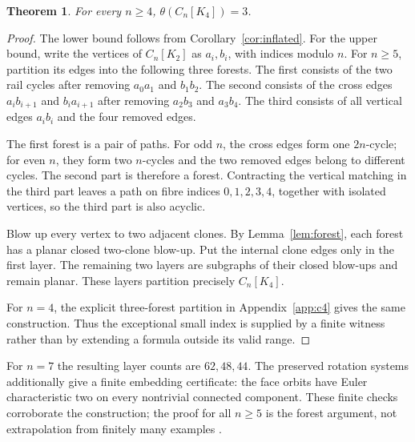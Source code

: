 \documentclass[11pt,letterpaper]{article}
\newtheorem{theorem}{Theorem}[section]
\theoremstyle{definition}
\theoremstyle{remark}\newtheorem{remark}[theorem]{Remark}
\begin{document}
\begin{theorem}\label{thm:thickness3}
For every $n\geq4$, $\theta(C_n[K_4])=3$.
\end{theorem}
\begin{proof}
The lower bound follows from Corollary~\ref{cor:inflated}. For the upper bound, write the vertices of $C_n[K_2]$ as $a_i,b_i$, with indices modulo $n$. For $n\geq5$, partition its edges into the following three forests. The first consists of the two rail cycles after removing $a_0a_1$ and $b_1b_2$. The second consists of the cross edges $a_i b_{i+1}$ and $b_i a_{i+1}$ after removing $a_2b_3$ and $a_3b_4$. The third consists of all vertical edges $a_i b_i$ and the four removed edges.

The first forest is a pair of paths. For odd $n$, the cross edges form one $2n$-cycle; for even $n$, they form two $n$-cycles and the two removed edges belong to different cycles. The second part is therefore a forest. Contracting the vertical matching in the third part leaves a path on fibre indices $0,1,2,3,4$, together with isolated vertices, so the third part is also acyclic.

Blow up every vertex to two adjacent clones. By Lemma~\ref{lem:forest}, each forest has a planar closed two-clone blow-up. Put the internal clone edges only in the first layer. The remaining two layers are subgraphs of their closed blow-ups and remain planar. These layers partition precisely $C_n[K_4]$.

For $n=4$, the explicit three-forest partition in Appendix~\ref{app:c4} gives the same construction. Thus the exceptional small index is supplied by a finite witness rather than by extending a formula outside its valid range.
\end{proof}
For $n=7$ the resulting layer counts are $62,48,44$. The preserved rotation systems additionally give a finite embedding certificate: the face orbits have Euler characteristic two on every nontrivial connected component. These finite checks corroborate the construction; the proof for all $n\geq5$ is the forest argument, not extrapolation from finitely many examples \cite{BeasleyFrontier}.
\end{document}
